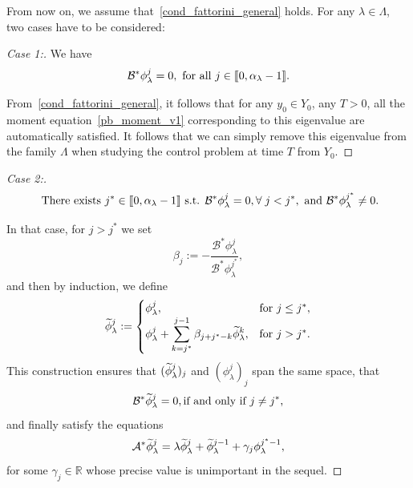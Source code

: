 \documentclass[11pt]{article}
\theoremstyle{definition}
\numberwithin{equation}{section}
\numberwithin{figure}{section}
\numberwithin{table}{section}
\newenvironment{step}[1]{\begin{proof}[#1]}{\let\qed\relax\end{proof}}
\newcommand{\llbracket}{\mathopen{[\mkern -2.7mu[}}
\newcommand{\rrbracket}{\mathclose{]\mkern -2.7mu]}}
\newcommand{\inter}[2]{\llbracket #1,#2 \rrbracket}
\newcommand\As{\mathcal{A}^*}
\newcommand\Bs{\mathcal{B}^*}
\newcommand{\Fzp}{Y_0}
\newcommand{\R}{\mathbb{R}}
\let\oldtilde\tilde
\renewcommand*{\tilde}[1]{\mathchoice{\widetilde{#1}}{\widetilde{#1}}{\oldtilde{#1}}{\oldtilde{#1}}}\let\oldexists\exists
\renewcommand*{\exists}{\mathrel{\oldexists}}
\let\oldforall\forall
\renewcommand*{\forall}{\mathrel{\oldforall}}
\begin{document}
From now on, we assume that~\eqref{cond_fattorini_general} holds. For any $\lambda\in \Lambda$, two cases have to be considered:
\begin{step}{Case 1:}
We have
\begin{equation*}\label{AC_case1}
\Bs \phi_\lambda^j=0, \ \text{for all }j\in \inter{0}{\alpha_\lambda-1}.
\end{equation*}

From~\eqref{cond_fattorini_general}, it follows that for any $y_0\in \Fzp$, any $T>0$, all the moment equation~\eqref{pb_moment_v1} corresponding to this eigenvalue are automatically satisfied. It follows that we can simply remove this eigenvalue from the family $\Lambda$ when studying the control problem at time $T$ from $\Fzp$.
\end{step}
\begin{step}{Case 2:}
\begin{equation}\label{AC_case2}
\text{ There exists } j^*\in \inter{0}{\alpha_\lambda-1} \text{ s.t. } \Bs \phi_\lambda^j=0, \forall j< j^*, \ \text{and} \ \Bs \phi_\lambda^{j^*}\neq 0.
\end{equation}

In that case, for $j>j^*$ we set
\[
\beta_j:=-\frac{\Bs \phi_\lambda^j}{\Bs \phi_\lambda^{j^*}},
\]
and then by induction, we define
\begin{equation}\label{def_phi_tilde}
\tilde{\phi}_\lambda^j :=
\begin{cases} \phi_\lambda^j,& \text{for }j\leq j^*,\\
\displaystyle \phi_\lambda^j + \sum_{k=j^*}^{j-1} \beta_{j+j^*-k} \tilde{\phi}_\lambda^k,& \text{for }j>j^*.
\end{cases}
\end{equation}
This construction ensures that $(\tilde{\phi}_\lambda^j)_j$ and $(\phi_\lambda^j)_j$ span the same space, that
\begin{equation}\label{observabilite_generale}
\Bs \tilde{\phi}_\lambda^j=0, \text{if and only if $j\neq j^*$,}
\end{equation}
and finally satisfy the equations
\[
\As \tilde{\phi}_\lambda^j = \lambda \tilde{\phi}_\lambda^j + \tilde{\phi}_\lambda^{j-1} + \gamma_j \phi_\lambda ^{j^*-1},
\]
for some $\gamma_j\in \R$ whose precise value is unimportant in the sequel.


\end{step}
\end{document}
